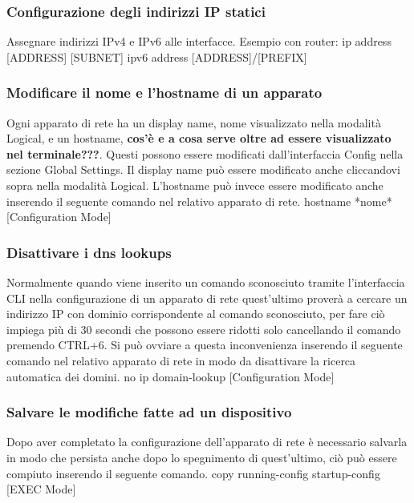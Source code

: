 \subsubsection{Configurazione degli indirizzi IP statici} %
Assegnare indirizzi IPv4 e IPv6 alle interfacce. \newline
Esempio con router: \newline
ip address [ADDRESS] [SUBNET] \newline
ipv6 address [ADDRESS]/[PREFIX]

\subsubsection{Modificare il nome e l'hostname di un apparato} %
Ogni apparato di rete ha un display name, nome visualizzato nella modalità Logical, e un hostname, \textbf{cos'è e a cosa serve oltre ad essere visualizzato nel terminale???}. Questi possono essere modificati dall'interfaccia Config nella sezione Global Settings. Il display name può essere modificato anche cliccandovi sopra nella modalità Logical. L'hostname può invece essere modificato anche inserendo il seguente comando nel relativo apparato di rete.
\newline
\smallskip
\newline
hostname *nome* [Configuration Mode] 

\subsubsection{Disattivare i dns lookups}
Normalmente quando viene inserito un comando sconosciuto tramite l'interfaccia CLI nella configurazione di un apparato di rete quest'ultimo proverà a cercare un indirizzo IP con dominio corrispondente al comando sconosciuto, per fare ciò impiega più di 30 secondi che possono essere ridotti solo cancellando il comando premendo CTRL+6. Si può ovviare a questa inconvenienza inserendo il seguente comando nel relativo apparato di rete in modo da disattivare la ricerca automatica dei domini. 
\newline
\smallskip
\newline
no ip domain-lookup [Configuration Mode] 

\subsubsection{Salvare le modifiche fatte ad un dispositivo}
Dopo aver completato la configurazione dell'apparato di rete è necessario salvarla in modo che persista anche dopo lo spegnimento di quest'ultimo, ciò può essere compiuto inserendo il seguente comando.  
\newline
\smallskip
\newline
copy running-config startup-config [EXEC Mode]